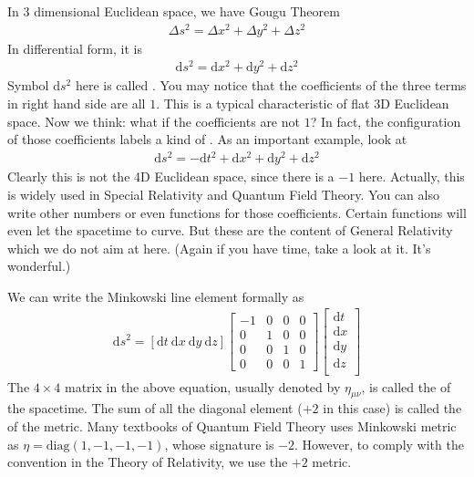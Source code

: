 \documentclass[letterpaper,10pt,english]{sphinxmanual}
\begin{document}
In 3 dimensional Euclidean space, we have Gougu Theorem
\begin{equation*}
\begin{split}\Delta s^2 = \Delta x^2 + \Delta y^2 + \Delta z^2\end{split}
\end{equation*}
In differential form, it is
\begin{equation*}
\begin{split}\mathrm d s^2 = \mathrm d x^2 + \mathrm d y^2 + \mathrm d z^2\end{split}
\end{equation*}
Symbol \(\mathrm d s^2\) here is called . You may notice that the coefficients of the three terms in right hand side are all \(1\). This is a typical characteristic of flat 3D Euclidean space. Now we think: what if the coefficients are not \(1\)? In fact, the configuration of those coefficients labels a kind of . As an important example, look at
\begin{equation*}
\begin{split}\mathrm d s^2 = -\mathrm d t^2 + \mathrm d x^2 + \mathrm d y^2 + \mathrm d z^2\end{split}
\end{equation*}
Clearly this is not the 4D Euclidean space, since there is a \(-1\) here. Actually, this is  widely used in Special Relativity and Quantum Field Theory. You can also write other numbers or even functions for those coefficients. Certain functions will even let the spacetime to curve. But these are the content of General Relativity which we do not aim at here. (Again if you have time, take a look at it. It’s wonderful.)

We can write the Minkowski line element formally as
\begin{equation*}
\begin{split}\mathrm d s^2 = [\mathrm d t\ \mathrm d x\ \mathrm d y\ \mathrm d z]
\left[
\begin{matrix}
-1 & 0 & 0 & 0\\
0 & 1 & 0 & 0\\
0 & 0 & 1 & 0\\
0 & 0 & 0 & 1
\end{matrix}
\right]
\left[
\begin{matrix}
\mathrm d t\\
\mathrm d x\\
\mathrm d y\\
\mathrm d z\\
\end{matrix}
\right]\end{split}
\end{equation*}
The \(4\times 4\) matrix in the above equation, usually denoted by \(\eta_{\mu\nu}\), is called the  of the spacetime. The sum of all the diagonal element (\(+2\) in this case) is called the  of the metric. Many textbooks of Quantum Field Theory uses Minkowski metric as \(\eta = \mathrm{diag}(1,-1,-1,-1)\), whose signature is \(-2\). However, to comply with the convention in the Theory of Relativity, we use the \(+2\) metric.
\end{document}
